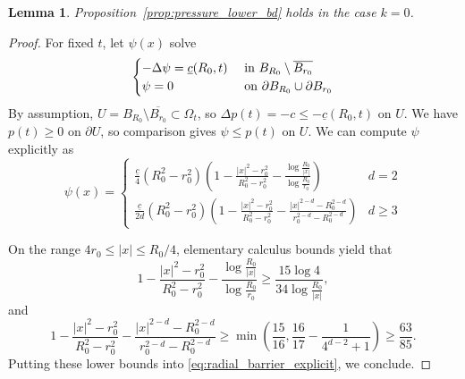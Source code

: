 \documentclass[11pt]{amsart}
\numberwithin{equation}{section}
\numberwithin{figure}{section}
\theoremstyle{plain}
\newtheorem{lem}[thm]{Lemma}
\theoremstyle{definition}
\theoremstyle{remark}
\theoremstyle{plain}
\begin{document}
\begin{lem}\label{lem:radial_subbarrier}
Proposition~\ref{prop:pressure_lower_bd} holds in the case $k = 0$.
\end{lem}
\begin{proof}
For fixed $t$, let $\psi(x)$ solve
\begin{equation}\label{eq:zs_annular_subsolution_eqn}
    \begin{cases}
        -\Delta \psi = \underline{c}(R_0,t) & \hbox{ in }B_{R_0}\setminus \overline{B_{r_0}} \\
        \psi = 0 & \hbox{ on }\partial B_{R_0}\cup \partial B_{r_0} \\
    \end{cases}
\end{equation}
By assumption, $U = B_{R_0}\setminus \overline{B_{r_0}} \subset \Omega_t$, so $\Delta p(t) = -c \leq -\underline{c}(R_0,t)$ on $U$. We have $p(t)\geq 0$ on $\partial U$, so comparison gives $\psi \leq p(t)$ on $U$. We can compute $\psi$ explicitly as
\begin{equation}\label{eq:radial_barrier_explicit}
    \psi(x) = \begin{cases}
        \frac{\underline{c}}{4}\left(R_0^2 - r_0^2\right)\left(1 - \frac{|x|^2 - r_0^2}{R_0^2 - r_0^2} - \frac{\log \frac{R_0}{|x|}}{\log\frac{R_0}{r_0}}\right) & d=2 \\
        \frac{\underline{c}}{2d}\left(R_0^2 - r_0^2\right)\left(1 - \frac{|x|^2 - r_0^2}{R_0^2 - r_0^2} - \frac{|x|^{2-d} - R_0^{2-d}}{r_0^{2-d} - R_0^{2-d}}\right) & d\geq 3
    \end{cases}
\end{equation}

On the range $4r_0 \leq |x| \leq R_0/4$, elementary calculus bounds yield that
\[ 1 - \frac{|x|^2 - r_0^2}{R_0^2 - r_0^2} - \frac{\log \frac{R_0}{|x|}}{\log\frac{R_0}{r_0}} \geq \frac{15\log 4 }{34\log \frac{R_0}{|x|}}, \]
and
\[ 1 - \frac{|x|^2 - r_0^2}{R_0^2 - r_0^2} - \frac{|x|^{2-d} - R_0^{2-d}}{r_0^{2-d} - R_0^{2-d}} \geq \min\left(\frac{15}{16}, \frac{16}{17} - \frac{1}{4^{d-2}+1}\right) \geq \frac{63}{85}. \]
Putting these lower bounds into \eqref{eq:radial_barrier_explicit}, we conclude.

\end{proof}
\end{document}
